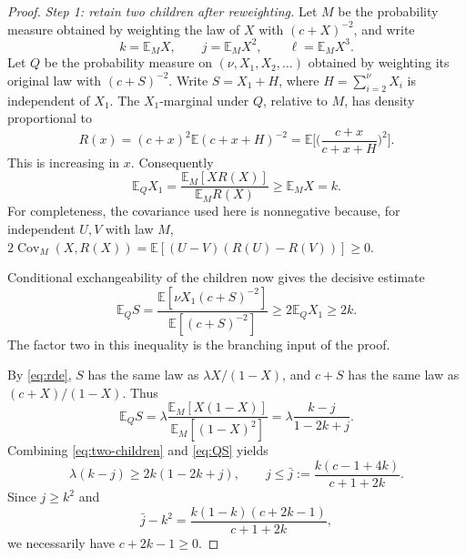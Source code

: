 \documentclass[11pt,a4paper]{article}
\numberwithin{equation}{section}
\theoremstyle{notethm}
\theoremstyle{definition}
\newcommand{\E}{\mathbb E}
\newcommand{\Cov}{\operatorname{Cov}}
\begin{document}
\begin{proof}
\emph{Step 1: retain two children after reweighting.}
Let $M$ be the probability measure obtained by weighting the law of $X$ with
$(c+X)^{-2}$, and write
\begin{equation}\label{eq:tilted-moments}
 k=\E_MX,\qquad j=\E_MX^2,\qquad \ell=\E_MX^3.
\end{equation}
Let $Q$ be the probability measure on $(\nu,X_1,X_2,\ldots)$ obtained by
weighting its original law with $(c+S)^{-2}$. Write
$S=X_1+H$, where $H=\sum_{i=2}^{\nu}X_i$ is independent of $X_1$.
The $X_1$-marginal under $Q$, relative to $M$, has density proportional to
\begin{equation}\label{eq:tilt-ratio}
 R(x)=(c+x)^2\E(c+x+H)^{-2}
     =\E\biggl[\biggl(\frac{c+x}{c+x+H}\biggr)^2\biggr].
\end{equation}
This is increasing in $x$. Consequently
\begin{equation}\label{eq:first-child}
 \E_QX_1=\frac{\E_M[XR(X)]}{\E_MR(X)}\ge \E_MX=k.
\end{equation}
For completeness, the covariance used here is nonnegative because, for
independent $U,V$ with law $M$,
$2\Cov_M(X,R(X))=\E[(U-V)(R(U)-R(V))]\ge0$.

Conditional exchangeability of the children now gives the decisive estimate
\begin{equation}\label{eq:two-children}
 \boxed{\quad
 \E_QS
 =\frac{\E[\nu X_1(c+S)^{-2}]}{\E[(c+S)^{-2}]}
 \ge2\E_QX_1\ge2k.
 \quad}
\end{equation}
The factor two in this inequality is the branching input of the proof.

By \eqref{eq:rde}, $S$ has the same law as $\lambda X/(1-X)$, and
$c+S$ has the same law as $(c+X)/(1-X)$. Thus
\begin{equation}\label{eq:QS}
 \E_QS=\lambda\frac{\E_M[X(1-X)]}{\E_M[(1-X)^2]}
     =\lambda\frac{k-j}{1-2k+j}.
\end{equation}
Combining \eqref{eq:two-children} and \eqref{eq:QS} yields
\begin{equation}\label{eq:moment-constraint}
 \lambda(k-j)\ge2k(1-2k+j),
 \qquad
 j\le\bar j:=\frac{k(c-1+4k)}{c+1+2k}.
\end{equation}
Since $j\ge k^2$ and
\begin{equation}\label{eq:moment-feasible}
 \bar j-k^2=\frac{k(1-k)(c+2k-1)}{c+1+2k},
\end{equation}
we necessarily have $c+2k-1\ge0$.


\end{proof}
\end{document}
